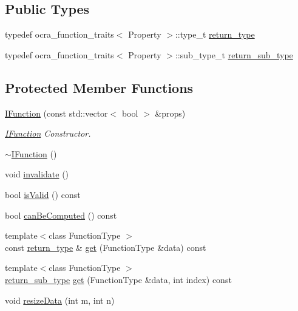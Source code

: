 \subsection*{Public Types}
{\bf }\par
\begin{DoxyCompactItemize}
\item 
typedef ocra\+\_\+function\+\_\+traits$<$ Property $>$\+::type\+\_\+t \hyperlink{classocra_1_1IFunction_a04d351c2f938d01046328b54fb7e6525}{return\+\_\+type}
\item 
typedef ocra\+\_\+function\+\_\+traits$<$ Property $>$\+::sub\+\_\+type\+\_\+t \hyperlink{classocra_1_1IFunction_ac6604adbd04613e1f545fb522cedbe3d}{return\+\_\+sub\+\_\+type}
\end{DoxyCompactItemize}

\subsection*{Protected Member Functions}
\begin{DoxyCompactItemize}
\item 
\hyperlink{classocra_1_1IFunction_a6aa2340376a035f9b80c747b09e701fa}{I\+Function} (const std\+::vector$<$ bool $>$ \&props)
\begin{DoxyCompactList}\small\item\em \hyperlink{classocra_1_1IFunction}{I\+Function} Constructor. \end{DoxyCompactList}\item 
\hyperlink{classocra_1_1IFunction_a60204ea5f57d3f369915022c9e431e32}{$\sim$\+I\+Function} ()
\item 
void \hyperlink{classocra_1_1IFunction_ae7cc0015416e006ad5682e7980f9c3d8}{invalidate} ()
\item 
bool \hyperlink{classocra_1_1IFunction_a22c891e865fd6a72ba1b3241010b4ecf}{is\+Valid} () const
\item 
bool \hyperlink{classocra_1_1IFunction_a18703c0b7573f9a1629236c9e10150d9}{can\+Be\+Computed} () const
\item 
{\footnotesize template$<$class Function\+Type $>$ }\\const \hyperlink{classocra_1_1IFunction_a04d351c2f938d01046328b54fb7e6525}{return\+\_\+type} \& \hyperlink{classocra_1_1IFunction_a0f7422af163eedba66749b79b9a70787}{get} (Function\+Type \&data) const
\item 
{\footnotesize template$<$class Function\+Type $>$ }\\\hyperlink{classocra_1_1IFunction_ac6604adbd04613e1f545fb522cedbe3d}{return\+\_\+sub\+\_\+type} \hyperlink{classocra_1_1IFunction_a53aa631366a527facee4f587ff8f7e09}{get} (Function\+Type \&data, int index) const
\item 
void \hyperlink{classocra_1_1IFunction_aab980c69fa11a61cbd49dad56dddca76}{resize\+Data} (int m, int n)
\end{DoxyCompactItemize}

